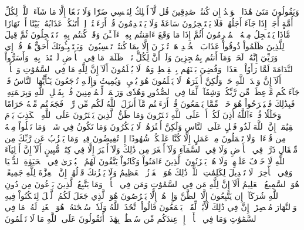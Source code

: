 وَيَقُولُونَ مَتَىٰ هَٰذَا ٱلۡوَعۡدُ إِن كُنتُمۡ صَٰدِقِينَ
قُل لَّآ أَمۡلِكُ لِنَفۡسِي ضَرّٗا وَلَا نَفۡعًا إِلَّا مَا شَآءَ ٱللَّهُۗ لِكُلِّ أُمَّةٍ أَجَلٌۚ إِذَا جَآءَ أَجَلُهُمۡ فَلَا يَسۡتَـٔۡخِرُونَ سَاعَةٗ وَلَا يَسۡتَقۡدِمُونَ
قُلۡ أَرَءَيۡتُمۡ إِنۡ أَتَىٰكُمۡ عَذَابُهُۥ بَيَٰتًا أَوۡ نَهَارٗا مَّاذَا يَسۡتَعۡجِلُ مِنۡهُ ٱلۡمُجۡرِمُونَ
أَثُمَّ إِذَا مَا وَقَعَ ءَامَنتُم بِهِۦٓۚ ءَآلۡـَٰٔنَ وَقَدۡ كُنتُم بِهِۦ تَسۡتَعۡجِلُونَ
ثُمَّ قِيلَ لِلَّذِينَ ظَلَمُواْ ذُوقُواْ عَذَابَ ٱلۡخُلۡدِ هَلۡ تُجۡزَوۡنَ إِلَّا بِمَا كُنتُمۡ تَكۡسِبُونَ
۞وَيَسۡتَنۢبِـُٔونَكَ أَحَقٌّ هُوَۖ قُلۡ إِي وَرَبِّيٓ إِنَّهُۥ لَحَقّٞۖ وَمَآ أَنتُم بِمُعۡجِزِينَ
وَلَوۡ أَنَّ لِكُلِّ نَفۡسٖ ظَلَمَتۡ مَا فِي ٱلۡأَرۡضِ لَٱفۡتَدَتۡ بِهِۦۗ وَأَسَرُّواْ ٱلنَّدَامَةَ لَمَّا رَأَوُاْ ٱلۡعَذَابَۖ وَقُضِيَ بَيۡنَهُم بِٱلۡقِسۡطِ وَهُمۡ لَا يُظۡلَمُونَ
أَلَآ إِنَّ لِلَّهِ مَا فِي ٱلسَّمَٰوَٰتِ وَٱلۡأَرۡضِۗ أَلَآ إِنَّ وَعۡدَ ٱللَّهِ حَقّٞ وَلَٰكِنَّ أَكۡثَرَهُمۡ لَا يَعۡلَمُونَ
هُوَ يُحۡيِۦ وَيُمِيتُ وَإِلَيۡهِ تُرۡجَعُونَ
يَـٰٓأَيُّهَا ٱلنَّاسُ قَدۡ جَآءَتۡكُم مَّوۡعِظَةٞ مِّن رَّبِّكُمۡ وَشِفَآءٞ لِّمَا فِي ٱلصُّدُورِ وَهُدٗى وَرَحۡمَةٞ لِّلۡمُؤۡمِنِينَ
قُلۡ بِفَضۡلِ ٱللَّهِ وَبِرَحۡمَتِهِۦ فَبِذَٰلِكَ فَلۡيَفۡرَحُواْ هُوَ خَيۡرٞ مِّمَّا يَجۡمَعُونَ
قُلۡ أَرَءَيۡتُم مَّآ أَنزَلَ ٱللَّهُ لَكُم مِّن رِّزۡقٖ فَجَعَلۡتُم مِّنۡهُ حَرَامٗا وَحَلَٰلٗا قُلۡ ءَآللَّهُ أَذِنَ لَكُمۡۖ أَمۡ عَلَى ٱللَّهِ تَفۡتَرُونَ
وَمَا ظَنُّ ٱلَّذِينَ يَفۡتَرُونَ عَلَى ٱللَّهِ ٱلۡكَذِبَ يَوۡمَ ٱلۡقِيَٰمَةِۗ إِنَّ ٱللَّهَ لَذُو فَضۡلٍ عَلَى ٱلنَّاسِ وَلَٰكِنَّ أَكۡثَرَهُمۡ لَا يَشۡكُرُونَ
وَمَا تَكُونُ فِي شَأۡنٖ وَمَا تَتۡلُواْ مِنۡهُ مِن قُرۡءَانٖ وَلَا تَعۡمَلُونَ مِنۡ عَمَلٍ إِلَّا كُنَّا عَلَيۡكُمۡ شُهُودًا إِذۡ تُفِيضُونَ فِيهِۚ وَمَا يَعۡزُبُ عَن رَّبِّكَ مِن مِّثۡقَالِ ذَرَّةٖ فِي ٱلۡأَرۡضِ وَلَا فِي ٱلسَّمَآءِ وَلَآ أَصۡغَرَ مِن ذَٰلِكَ وَلَآ أَكۡبَرَ إِلَّا فِي كِتَٰبٖ مُّبِينٍ
أَلَآ إِنَّ أَوۡلِيَآءَ ٱللَّهِ لَا خَوۡفٌ عَلَيۡهِمۡ وَلَا هُمۡ يَحۡزَنُونَ
ٱلَّذِينَ ءَامَنُواْ وَكَانُواْ يَتَّقُونَ
لَهُمُ ٱلۡبُشۡرَىٰ فِي ٱلۡحَيَوٰةِ ٱلدُّنۡيَا وَفِي ٱلۡأٓخِرَةِۚ لَا تَبۡدِيلَ لِكَلِمَٰتِ ٱللَّهِۚ ذَٰلِكَ هُوَ ٱلۡفَوۡزُ ٱلۡعَظِيمُ
وَلَا يَحۡزُنكَ قَوۡلُهُمۡۘ إِنَّ ٱلۡعِزَّةَ لِلَّهِ جَمِيعًاۚ هُوَ ٱلسَّمِيعُ ٱلۡعَلِيمُ
أَلَآ إِنَّ لِلَّهِ مَن فِي ٱلسَّمَٰوَٰتِ وَمَن فِي ٱلۡأَرۡضِۗ وَمَا يَتَّبِعُ ٱلَّذِينَ يَدۡعُونَ مِن دُونِ ٱللَّهِ شُرَكَآءَۚ إِن يَتَّبِعُونَ إِلَّا ٱلظَّنَّ وَإِنۡ هُمۡ إِلَّا يَخۡرُصُونَ
هُوَ ٱلَّذِي جَعَلَ لَكُمُ ٱلَّيۡلَ لِتَسۡكُنُواْ فِيهِ وَٱلنَّهَارَ مُبۡصِرًاۚ إِنَّ فِي ذَٰلِكَ لَأٓيَٰتٖ لِّقَوۡمٖ يَسۡمَعُونَ
قَالُواْ ٱتَّخَذَ ٱللَّهُ وَلَدٗاۗ سُبۡحَٰنَهُۥۖ هُوَ ٱلۡغَنِيُّۖ لَهُۥ مَا فِي ٱلسَّمَٰوَٰتِ وَمَا فِي ٱلۡأَرۡضِۚ إِنۡ عِندَكُم مِّن سُلۡطَٰنِۭ بِهَٰذَآۚ أَتَقُولُونَ عَلَى ٱللَّهِ مَا لَا تَعۡلَمُونَ
